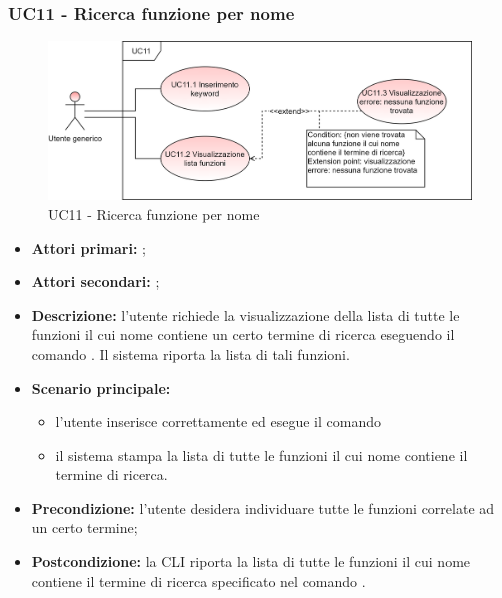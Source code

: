 \subsubsection{UC11 - Ricerca funzione per nome}
\begin{figure}[H]
	\centering
	\includegraphics[scale=\ucs]{./res/img/UC11.png}
	\caption {UC11 - Ricerca funzione per nome}
\end{figure}
\begin{itemize}
	\item \textbf{Attori primari:} \ua{};
	\item \textbf{Attori secondari:} \re{};
	\item \textbf{Descrizione:} l’utente richiede la visualizzazione della lista di tutte le funzioni il cui nome contiene un certo termine di ricerca eseguendo il comando \psearch{}. Il sistema riporta la lista di tali funzioni. 
	\item \textbf{Scenario principale:} 
	\begin{itemize}
		\item l’utente inserisce correttamente ed esegue il comando \psearch{} 
		\item il sistema stampa la lista di tutte le funzioni il cui nome contiene il termine di ricerca.
	\end{itemize}
	\item \textbf{Precondizione:} l’utente desidera individuare tutte le funzioni correlate ad un certo termine;
	\item \textbf{Postcondizione:} la CLI riporta la lista di tutte le funzioni il cui nome contiene il termine di ricerca specificato nel comando \search{}.
\end{itemize}